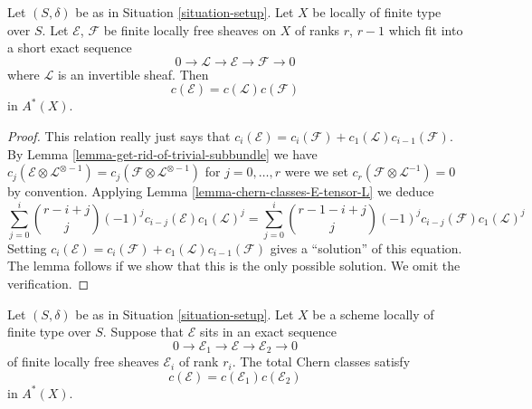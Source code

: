 \begin{lemma}
\label{lemma-additivity-invertible-subsheaf}
Let $(S, \delta)$ be as in Situation \ref{situation-setup}.
Let $X$ be locally of finite type over $S$.
Let $\mathcal{E}$, $\mathcal{F}$ be finite locally free sheaves
on $X$ of ranks $r$, $r - 1$ which fit into a short
exact sequence
$$
0 \to \mathcal{L} \to \mathcal{E} \to \mathcal{F} \to 0
$$
where $\mathcal{L}$ is an invertible sheaf.
Then
$$
c(\mathcal{E}) = c(\mathcal{L}) c(\mathcal{F})
$$
in $A^*(X)$.
\end{lemma}

\begin{proof}
This relation really just says that
$c_i(\mathcal{E}) = c_i(\mathcal{F}) + c_1(\mathcal{L})c_{i - 1}(\mathcal{F})$.
By Lemma \ref{lemma-get-rid-of-trivial-subbundle}
we have $c_j(\mathcal{E} \otimes \mathcal{L}^{\otimes -1})
= c_j(\mathcal{F} \otimes \mathcal{L}^{\otimes -1})$ for
$j = 0, \ldots, r$ were we set
$c_r(\mathcal{F} \otimes \mathcal{L}^{-1}) = 0$ by convention.
Applying Lemma \ref{lemma-chern-classes-E-tensor-L} we deduce
$$
\sum_{j = 0}^i
\binom{r - i + j}{j} (-1)^j c_{i - j}({\mathcal E}) c_1({\mathcal L})^j
=
\sum_{j = 0}^i
\binom{r - 1 - i + j}{j} (-1)^j c_{i - j}({\mathcal F}) c_1({\mathcal L})^j
$$
Setting
$c_i(\mathcal{E}) = c_i(\mathcal{F}) + c_1(\mathcal{L})c_{i - 1}(\mathcal{F})$
gives a ``solution'' of this equation. The lemma follows if we show
that this is the only possible solution. We omit the verification.
\end{proof}

\begin{lemma}
\label{lemma-additivity-chern-classes}
Let $(S, \delta)$ be as in Situation \ref{situation-setup}.
Let $X$ be a scheme locally of finite type over $S$.
Suppose that ${\mathcal E}$ sits in an
exact sequence
$$
0
\to
{\mathcal E}_1
\to
{\mathcal E}
\to
{\mathcal E}_2
\to
0
$$
of finite locally free sheaves $\mathcal{E}_i$ of rank $r_i$.
The total Chern classes satisfy
$$
c({\mathcal E}) = c({\mathcal E}_1) c({\mathcal E}_2)
$$
in $A^*(X)$.
\end{lemma}

